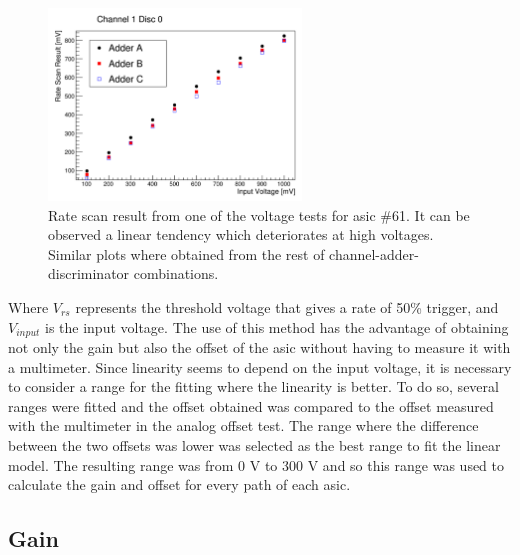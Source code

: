 \documentclass[main.tex]{subfiles}
\begin{document}
\begin{figure}
  \centering
  \includegraphics[width=0.6\textwidth]{./Pictures/linearfit.pdf}
  \caption{Rate scan result from one of the voltage tests for \gls{asic} \#61. It can be observed a linear tendency which deteriorates at high voltages.
    Similar plots where obtained from the rest of channel-adder-discriminator combinations. }
  \label{fig:linearfit}
\end{figure}

Where $V_{rs}$ represents the threshold voltage that gives a rate of 50\% trigger, and $V_{input}$ is the input voltage. The use of this method has the advantage of obtaining not only the gain but also the offset of the \gls{asic} without having to measure it with a multimeter. Since linearity seems to depend on the input voltage, it is necessary to consider a range for the fitting where the linearity is better. To do so, several ranges were fitted and the offset obtained was compared to the offset measured with the multimeter in the analog offset test. The range where the difference between the two offsets was lower was selected as the best range to fit the linear model. The resulting range was from 0 V to 300 V and so this range was used to calculate the gain and offset for every path of each \gls{asic}.

\subsection{Gain}
\end{document}
